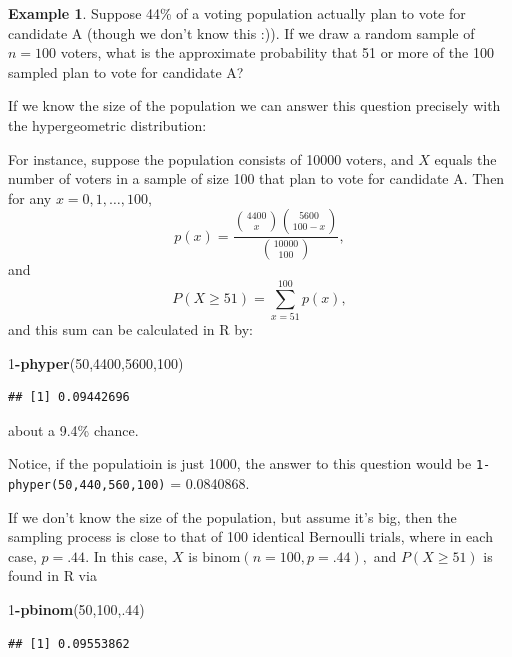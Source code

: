 \documentclass[
]{book}
\newenvironment{Shaded}{\begin{snugshade}}{\end{snugshade}}
\newcommand{\DecValTok}[1]{\textcolor[rgb]{0.00,0.00,0.81}{#1}}
\newcommand{\FunctionTok}[1]{\textcolor[rgb]{0.13,0.29,0.53}{\textbf{#1}}}
\newcommand{\NormalTok}[1]{#1}
\newcommand{\SpecialCharTok}[1]{\textcolor[rgb]{0.81,0.36,0.00}{\textbf{#1}}}
\theoremstyle{definition}
\theoremstyle{definition}
\newtheorem{example}{Example}[chapter]
\theoremstyle{definition}
\theoremstyle{definition}
\theoremstyle{remark}
\begin{document}
\begin{example}
Suppose 44\% of a voting population actually plan to vote for candidate A (though we don't know this :)). If we draw a random sample of \(n = 100\) voters, what is the approximate probability that 51 or more of the 100 sampled plan to vote for candidate A?

If we know the size of the population we can answer this question precisely with the hypergeometric distribution:

For instance, suppose the population consists of 10000 voters, and \(X\) equals the number of voters in a sample of size 100 that plan to vote for candidate A. Then for any \(x = 0, 1, \ldots, 100,\)
\[p(x) = \frac{\binom{4400}{x}\binom{5600}{100-x}}{\binom{10000}{100}},\]
and \[P(X \geq 51) = \sum_{x = 51}^{100} p(x),\]
and this sum can be calculated in R by:

\begin{Shaded}
\begin{Highlighting}[]
\DecValTok{1}\SpecialCharTok{{-}}\FunctionTok{phyper}\NormalTok{(}\DecValTok{50}\NormalTok{,}\DecValTok{4400}\NormalTok{,}\DecValTok{5600}\NormalTok{,}\DecValTok{100}\NormalTok{)}
\end{Highlighting}
\end{Shaded}

\begin{verbatim}
## [1] 0.09442696
\end{verbatim}

about a 9.4\% chance.

Notice, if the populatioin is just 1000, the answer to this question would be \texttt{1-phyper(50,440,560,100)} = 0.0840868.

If we don't know the size of the population, but assume it's big, then the sampling process is close to that of 100 identical Bernoulli trials, where in each case, \(p = .44\). In this case, \(X\) is \(\text{binom}(n=100,p=.44),\) and \(P(X \geq 51)\) is found in R via

\begin{Shaded}
\begin{Highlighting}[]
\DecValTok{1}\SpecialCharTok{{-}}\FunctionTok{pbinom}\NormalTok{(}\DecValTok{50}\NormalTok{,}\DecValTok{100}\NormalTok{,.}\DecValTok{44}\NormalTok{)}
\end{Highlighting}
\end{Shaded}

\begin{verbatim}
## [1] 0.09553862
\end{verbatim}


\end{example}
\end{document}
